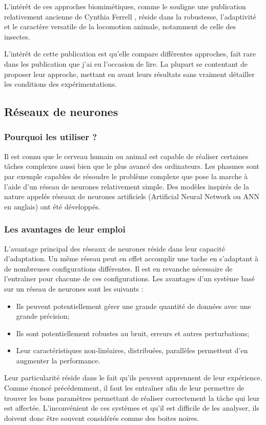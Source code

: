 \documentclass{tnreport}
\begin{document}
L'intérêt de ces approches biomimétiques, comme le souligne une publication relativement ancienne de Cynthia Ferrell \cite{ferrell_comparison_1995}, réside dans la robustesse, l'adaptivité et le caractère versatile de la locomotion animale, notamment de celle des insectes. 

L'intérêt de cette publication est qu'elle compare différentes approches, fait rare dans les publication que j'ai eu l'occasion de lire. La plupart se contentant de proposer leur approche, mettant en avant leurs résultats sans vraiment détailler les conditions des expérimentations.


\subsection{Réseaux de neurones}

\subsubsection{Pourquoi les utiliser ?}
Il est connu que le cerveau humain ou animal est capable de réaliser certaines tâches complexes aussi bien que le plus avancé des ordinateurs. Les phasmes sont par exemple capables de résoudre le problème complexe que pose la marche à l'aide d'un réseau de neurones relativement simple. Des modèles inspirés de la nature appelés réseaux de neurones artificiels (Artificial Neural Network ou ANN en anglais) ont été développés.  

\subsubsection{Les avantages de leur emploi}
L'avantage principal des réseaux de neurones réside dans leur capacité d'adaptation. Un même réseau peut en effet accomplir une tache en s'adaptant à de nombreuses configurations différentes. Il est en revanche nécessaire de l'entraîner pour chacune de ces configurations. Les avantages d'un système basé sur un réseau de neurones sont les suivants :
\begin{itemize}
    \item Ils peuvent potentiellement gérer une grande quantité de données avec une grande précision;
    \item Ils sont potentiellement robustes au bruit, erreurs et autres perturbations;
    \item Leur caractéristiques non-linéaires, distribuées, parallèles permettent d'en augmenter la performance.
\end{itemize}
\vspace{0.5cm}
Leur particularité réside dans le fait qu'ils peuvent apprennent de leur expérience. Comme énoncé précédemment, il faut les entraîner afin de leur permettre de trouver les bons paramètres permettant de réaliser correctement la tâche qui leur est affectée. L'inconvénient de ces systèmes et qu'il est difficile de les analyser, ils doivent donc être souvent considérés comme des boites noires. 
\end{document}
